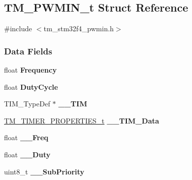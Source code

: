 \hypertarget{struct_t_m___p_w_m_i_n__t}{}\subsection{T\+M\+\_\+\+P\+W\+M\+I\+N\+\_\+t Struct Reference}
\label{struct_t_m___p_w_m_i_n__t}


{\ttfamily \#include $<$tm\+\_\+stm32f4\+\_\+pwmin.\+h$>$}

\subsubsection*{Data Fields}
\begin{DoxyCompactItemize}
\item 
\hypertarget{struct_t_m___p_w_m_i_n__t_a9d3c19e881c80a6596884ecb8da4a0f4}{}float {\bfseries Frequency}\label{struct_t_m___p_w_m_i_n__t_a9d3c19e881c80a6596884ecb8da4a0f4}

\item 
\hypertarget{struct_t_m___p_w_m_i_n__t_a3f8f40802b67665aaafbdf1fb4c6c4c4}{}float {\bfseries Duty\+Cycle}\label{struct_t_m___p_w_m_i_n__t_a3f8f40802b67665aaafbdf1fb4c6c4c4}

\item 
\hypertarget{struct_t_m___p_w_m_i_n__t_a496ac0a45cbd303e60a9e9b3096c3aae}{}T\+I\+M\+\_\+\+Type\+Def $\ast$ {\bfseries \+\_\+\+\_\+\+T\+I\+M}\label{struct_t_m___p_w_m_i_n__t_a496ac0a45cbd303e60a9e9b3096c3aae}

\item 
\hypertarget{struct_t_m___p_w_m_i_n__t_af15ba4c18fb7e346889438bc24484ca7}{}\hyperlink{struct_t_m___t_i_m_e_r___p_r_o_p_e_r_t_i_e_s__t}{T\+M\+\_\+\+T\+I\+M\+E\+R\+\_\+\+P\+R\+O\+P\+E\+R\+T\+I\+E\+S\+\_\+t} {\bfseries \+\_\+\+\_\+\+T\+I\+M\+\_\+\+Data}\label{struct_t_m___p_w_m_i_n__t_af15ba4c18fb7e346889438bc24484ca7}

\item 
\hypertarget{struct_t_m___p_w_m_i_n__t_a4336a40733b75720701681d08ebd5532}{}float {\bfseries \+\_\+\+\_\+\+Freq}\label{struct_t_m___p_w_m_i_n__t_a4336a40733b75720701681d08ebd5532}

\item 
\hypertarget{struct_t_m___p_w_m_i_n__t_ae53851ad473d5dffb94ad7bf08c98a8d}{}float {\bfseries \+\_\+\+\_\+\+Duty}\label{struct_t_m___p_w_m_i_n__t_ae53851ad473d5dffb94ad7bf08c98a8d}

\item 
\hypertarget{struct_t_m___p_w_m_i_n__t_ad88fcca9a18f9215a85e669cdf89ebca}{}uint8\+\_\+t {\bfseries \+\_\+\+\_\+\+Sub\+Priority}\label{struct_t_m___p_w_m_i_n__t_ad88fcca9a18f9215a85e669cdf89ebca}

\end{DoxyCompactItemize}


